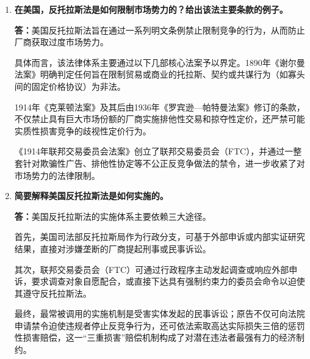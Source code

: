 \begin{enumerate}[label=\textbf{\arabic*.}, leftmargin=*]
\begin{center}
		\end{center}
		
		\item \textbf{在美国，反托拉斯法是如何限制市场势力的？给出该法主要条款的例子。}
		
		\textbf{答：}美国反托拉斯法旨在通过一系列明文条例禁止限制竞争的行为，从而防止厂商获取过度市场势力。
		
		具体而言，该法律体系主要通过以下几部核心法案予以界定。1890年《谢尔曼法案》明确判定任何旨在限制贸易或商业的托拉斯、契约或共谋行为（如寡头间的固定价格协议）为非法。
		
		1914年《克莱顿法案》及其后由1936年《罗宾逊—帕特曼法案》修订的条款，不仅禁止具有巨大市场份额的厂商实施排他性交易和掠夺性定价，还严禁可能实质性损害竞争的歧视性定价行为。
		
		《1914年联邦交易委员会法案》创立了联邦交易委员会（FTC），并通过一整套针对欺骗性广告、排他性协定等不公正反竞争做法的禁令，进一步收紧了对市场势力的法律限制。
		
		\item \textbf{简要解释美国反托拉斯法是如何实施的。}
		
		\textbf{答：}美国反托拉斯法的实施体系主要依赖三大途径。
		
		首先，美国司法部反托拉斯局作为行政分支，可基于外部申诉或内部实证研究结果，直接对涉嫌垄断的厂商提起刑事或民事诉讼。
		
		其次，联邦交易委员会（FTC）可通过行政程序主动发起调查或响应外部申诉，要求调查对象自愿配合，或直接下达具有强制约束力的委员会命令以迫使其遵守反托拉斯法。
		
		最终，最常被调用的实施机制是受害实体发起的民事诉讼；原告不仅可向法院申请禁令迫使违规者停止反竞争行为，还可依法索取高达实际损失三倍的惩罚性损害赔偿，这一“三重损害”赔偿机制构成了对潜在违法者最强有力的经济制约。
	\end{enumerate}
	\newpage
